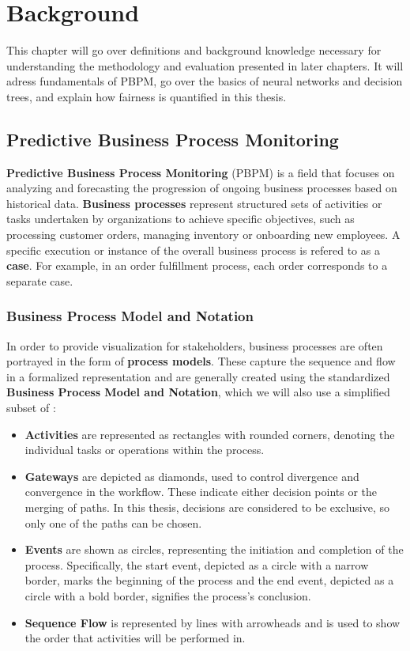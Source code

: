 \chapter{Background}
This chapter will go over definitions and background knowledge
necessary for understanding the methodology and evaluation presented in later chapters.
It will adress fundamentals of PBPM, go over the basics of neural networks and decision trees,
and explain how fairness is quantified in this thesis.

\section{Predictive Business Process Monitoring}
\textbf{Predictive Business Process Monitoring} (PBPM) is a field that focuses on analyzing
and forecasting the progression of ongoing business processes based on historical data. 
\textbf{Business processes} represent structured sets of activities
or tasks undertaken by organizations to achieve specific objectives,
such as processing customer orders, managing inventory or onboarding new employees.
A specific execution or instance of the overall business process is refered to as a \textbf{case}.
For example, in an order fulfillment process, each order corresponds to a separate case.

\subsection{Business Process Model and Notation}
In order to provide visualization for stakeholders,
business processes are often portrayed in the form of \textbf{process models}.
These capture the sequence and flow in a formalized representation
and are generally created using the standardized
\textbf{Business Process Model and Notation},
which we will also use a simplified subset of \cite{bpmn}:
\begin{itemize}
\item \textbf{Activities} are represented as rectangles with rounded corners,
denoting the individual tasks or operations within the process.
\item \textbf{Gateways} are depicted as diamonds,
used to control divergence and convergence in the workflow.
These indicate either decision points or the merging of paths.
In this thesis, decisions are considered to be exclusive,
so only one of the paths can be chosen.
\item \textbf{Events} are shown as circles,
representing the initiation and completion of the process.
Specifically, the start event,
depicted as a circle with a narrow border, marks the beginning of the process
and the end event, depicted as a circle with a bold border, signifies the process's conclusion.
\item \textbf{Sequence Flow} is represented by lines with arrowheads
and is used to show the order that activities will be performed in.
\end{itemize}

